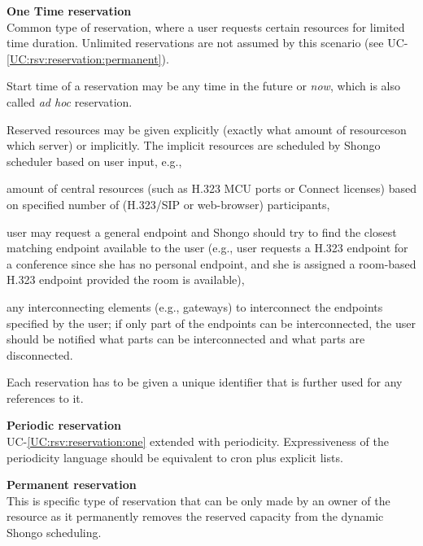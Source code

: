 \documentclass[a4paper]{report}
\makeatletter
\newcounter{UCcounter}
\newenvironment{UseCases}%
	{\begin{list}{UC-\arabic{UCcounter}}{\@nmbrlisttrue\def\@listctr{UCcounter}}}%
	{\end{list}}
\newcommand{\UClabel}[1]{\label{UC:#1}}
\newcommand{\UCref}[1]{UC-\ref{UC:#1}}
\newcommand{\UseCase}[2]{\item\UClabel{#2} \textbf{#1}\\}
\makeatother
\begin{document}
\begin{UseCases}

\UseCase{One Time reservation}{rsv:reservation:one}

Common type of reservation, where a user requests certain resources for limited
time duration. Unlimited reservations are not assumed by this scenario (see
\UCref{rsv:reservation:permanent}).

Start time of a reservation may be any time in the future or \emph{now}, which
is also called \emph{ad hoc} reservation.

Reserved resources may be given explicitly (exactly what amount of resourceson
which server) or implicitly.  The implicit resources are scheduled by Shongo
scheduler based on user input, e.g., 

\begin{compactitem}

\item amount of central resources (such as H.323 MCU ports or Connect licenses)
based on specified number of (H.323/SIP or web-browser) participants,

\item user may request a general endpoint and Shongo should try to find the
closest matching endpoint available to the user (e.g., user requests a H.323
endpoint for a conference since she has no personal endpoint, and she is
assigned a room-based H.323 endpoint provided the room is available),

\item any interconnecting elements (e.g., gateways) to interconnect the
endpoints specified by the user; if only part of the endpoints can be
interconnected, the user should be notified what parts can be interconnected
and what parts are disconnected.

\end{compactitem}

Each reservation has to be given a unique identifier that is further used for
any references to it.


\UseCase{Periodic reservation}{rsv:reservation:periodic}

\UCref{rsv:reservation:one} extended with periodicity. Expressiveness of the
periodicity language should be equivalent to cron plus explicit lists.

\UseCase{Permanent reservation}{rsv:reservation:permanent}

This is specific type of reservation that can be only made by an owner of the
resource as it permanently removes the reserved capacity from the dynamic
Shongo scheduling.


\end{UseCases}
\end{document}
